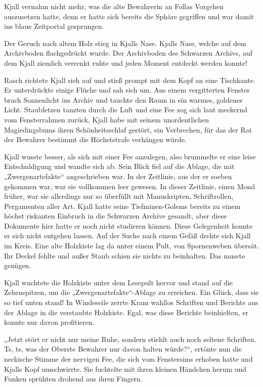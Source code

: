 Kjall vernahm nicht mehr, was die alte Bewahrerin an Follas Vorgehen auszusetzen hatte, denn er hatte sich bereits die Sphäre gegriffen und war damit ins blaue Zeitportal gesprungen.



\trennzeichen



Der Geruch nach altem Holz stieg in Kjalls Nase. Kjalls Nase, welche auf dem Archivboden flachgedrückt wurde. Der Archivboden des Schwarzen Archivs, auf dem Kjall ziemlich verrenkt ruhte und jeden Moment entdeckt werden konnte!

Rasch richtete Kjall sich auf und stieß prompt mit dem Kopf an eine Tischkante. Er unterdrückte einige Flüche und sah sich um. Aus einem vergitterten Fenster brach Sonnenlicht ins Archiv und tauchte den Raum in ein warmes, goldenes Licht. Staubfetzen tanzten durch die Luft und eine Fee zog sich laut meckernd vom Fensterrahmen zurück, Kjall habe mit seinem unordentlichen Magiedingsbums ihren Schönheitsschlaf gestört, ein Verbrechen, für das der Rat der Bewahrer bestimmt die Höchststrafe verhängen würde.

Kjall wusste besser, als sich mit einer Fee anzulegen, also brummelte er eine leise Entschuldigung und wandte sich ab. Sein Blick fiel auf die Ablage, die mit „Zwergenartefakte“ angeschrieben war. In der Zeitlinie, aus der er soeben gekommen war, war sie vollkommen leer gewesen. In dieser Zeitlinie, einen Mond früher, war sie allerdings nur so überfüllt mit Manuskripten, Schriftrollen, Pergamenten aller Art. Kjall hatte seine Tiefminen-Golems bereits zu einem höchst riskanten Einbruch in die Schwarzen Archive gesandt, aber diese Dokumente hier hatte er noch nicht studieren können. Diese Gelegenheit konnte er sich nicht entgehen lassen. Auf der Suche nach einem Gefäß drehte sich Kjall im Kreis. Eine alte Holzkiste lag da unter einem Pult, von Spornenweben übersät. Ihr Deckel fehlte und außer Staub schien sie nichts zu beinhalten. Das musste genügen.

Kjall wuchtete die Holzkiste unter dem Lesepult hervor und stand auf die Zehenspitzen, um die „Zwergenartefakte“-Ablage zu erreichen. Ein Glück, dass sie so tief unten stand! In Windeseile zerrte Kram wahllos Schriften und Berichte aus der Ablage in die verstaubte Holzkiste. Egal, was diese Berichte beinhielten, er konnte nur davon profitieren.

„Jetzt stört er nicht nur meine Ruhe, sondern stiehlt auch noch seltene Schriften. Ts, ts, was der Oberste Bewahrer nur davon halten würde?“, ertönte nun die neckische Stimme der nervigen Fee, die sich vom Fenstersims erhoben hatte und Kjalls Kopf umschwirrte. Sie fuchtelte mit ihren kleinen Händchen herum und Funken sprühten drohend aus ihren Fingern.

